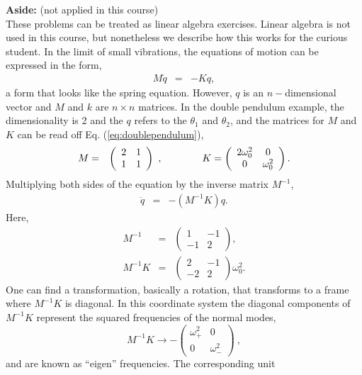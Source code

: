 {\bf Aside:} (not applied in this course)\\ These problems can be
treated as linear algebra exercises. Linear algebra is not used in
this course, but nonetheless we describe how this works for the
curious student. In the limit of small vibrations, the equations of
motion can be expressed in the form,
\begin{eqnarray*}
M\ddot{q}&=&-Kq,
\end{eqnarray*}
a form that looks like the spring equation. However, $q$ is an
$n-$dimensional vector and $M$ and $k$ are $n\times n$ matrices. In
the double pendulum example, the dimensionality is 2 and the $q$
refers to the $\theta_1$ and $\theta_2$, and the matrices for $M$ and
$K$ can be read off Eq. (\ref{eq:doublependulum}),
\begin{eqnarray*}
M&=&\left(\begin{array}{cc}
  2&1\\ 1&1\end{array}\right)~,\hspace*{40pt}
  K=\left(\begin{array}{cc}
    2\omega_0^2&0\\ 0&\omega_0^2\end{array}\right).
\end{eqnarray*}
Multiplying both sides of the equation by the inverse matrix $M^{-1}$,
\begin{eqnarray*}
\ddot{q}&=&-\left(M^{-1}K\right)q.
\end{eqnarray*}
Here,
\begin{eqnarray*}
M^{-1}&=&\left(\begin{array}{cc}
  1&-1\\ -1&2\end{array}\right),\\ M^{-1}K&=&\left(\begin{array}{cc}
    2&-1\\ -2&2\end{array}\right)\omega_0^2.
\end{eqnarray*}
One can find a transformation, basically a rotation, that transforms
to a frame where $M^{-1}K$ is diagonal. In this coordinate system the
diagonal components of $M^{-1}K$ represent the squared frequencies of
the normal modes,
\[
M^{-1}K\rightarrow -\left(\begin{array}{cc}
  \omega_+^2&0\\ 0&\omega_-^2\end{array}\right)~,
\]
and are known as ``eigen'' frequencies. The corresponding unit
